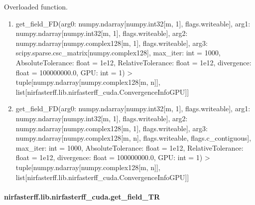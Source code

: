 \documentclass[letterpaper,10pt,english]{sphinxmanual}
\begin{document}
\begin{fulllineitems}
\label{\detokenize{_autosummary/nirfasterff.lib.nirfasterff_cuda.get_field_FD:nirfasterff.lib.nirfasterff_cuda.get_field_FD}}
\pysigstartsignatures
\pysiglinewithargsret
{}
{\sphinxparamcomma {}}
{}
\pysigstopsignatures
\sphinxAtStartPar
Overloaded function.
\begin{enumerate}
%
\item {} 
\sphinxAtStartPar
get\_field\_FD(arg0: numpy.ndarray{[}numpy.int32{[}m, 1{]}, flags.writeable{]}, arg1: numpy.ndarray{[}numpy.int32{[}m, 1{]}, flags.writeable{]}, arg2: numpy.ndarray{[}numpy.complex128{[}m, 1{]}, flags.writeable{]}, arg3: scipy.sparse.csc\_matrix{[}numpy.complex128{]}, max\_iter: int = 1000, AbsoluteTolerance: float = 1e\sphinxhyphen{}12, RelativeTolerance: float = 1e\sphinxhyphen{}12, divergence: float = 100000000.0, GPU: int = \sphinxhyphen{}1) \sphinxhyphen{}\textgreater{} tuple{[}numpy.ndarray{[}numpy.complex128{[}m, n{]}{]}, list{[}nirfasterff.lib.nirfasterff\_cuda.ConvergenceInfoGPU{]}{]}

\item {} 
\sphinxAtStartPar
get\_field\_FD(arg0: numpy.ndarray{[}numpy.int32{[}m, 1{]}, flags.writeable{]}, arg1: numpy.ndarray{[}numpy.int32{[}m, 1{]}, flags.writeable{]}, arg2: numpy.ndarray{[}numpy.complex128{[}m, 1{]}, flags.writeable{]}, arg3: numpy.ndarray{[}numpy.complex128{[}m, n{]}, flags.writeable, flags.c\_contiguous{]}, max\_iter: int = 1000, AbsoluteTolerance: float = 1e\sphinxhyphen{}12, RelativeTolerance: float = 1e\sphinxhyphen{}12, divergence: float = 100000000.0, GPU: int = \sphinxhyphen{}1) \sphinxhyphen{}\textgreater{} tuple{[}numpy.ndarray{[}numpy.complex128{[}m, n{]}{]}, list{[}nirfasterff.lib.nirfasterff\_cuda.ConvergenceInfoGPU{]}{]}

\end{enumerate}

\end{fulllineitems}


\sphinxstepscope


\paragraph{nirfasterff.lib.nirfasterff\_cuda.get\_field\_TR}
\label{\detokenize{_autosummary/nirfasterff.lib.nirfasterff_cuda.get_field_TR:nirfasterff-lib-nirfasterff-cuda-get-field-tr}}\label{\detokenize{_autosummary/nirfasterff.lib.nirfasterff_cuda.get_field_TR::doc}}
\end{document}
